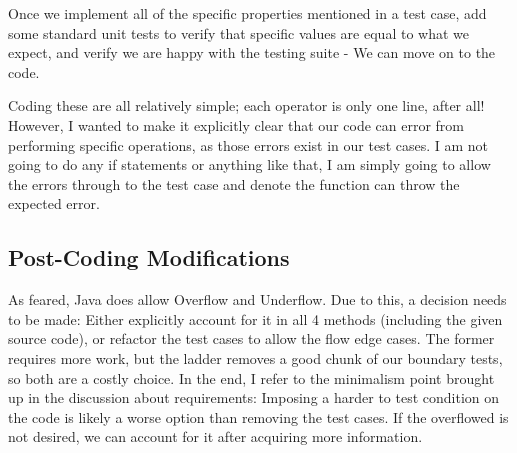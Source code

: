 \documentclass{article}
\begin{document}
Once we implement all of the specific properties mentioned in a test
case, add some standard unit tests to verify that specific values are
equal to what we expect, and verify we are happy with the testing
suite - We can move on to the code.

Coding these are all relatively simple; each operator is only one
line, after all! However, I wanted to make it explicitly clear that
our code can error from performing specific operations, as those
errors exist in our test cases. I am not going to do any if statements
or anything like that, I am simply going to allow the errors through
to the test case and denote the function can throw the expected error.

\subsection{Post-Coding Modifications}

As feared, Java does allow Overflow and Underflow. Due to this, a decision needs to be made: Either explicitly account for it in all 4 methods (including the given source code), or refactor the test cases to allow the flow edge cases. The former requires more work, but the ladder removes a good chunk of our boundary tests, so both are a costly choice. In the end, I refer to the minimalism point brought up in the discussion about requirements: Imposing a harder to test condition on the code is likely a worse option than removing the test cases. If the overflowed is not desired, we can account for it after acquiring more information.
\end{document}

